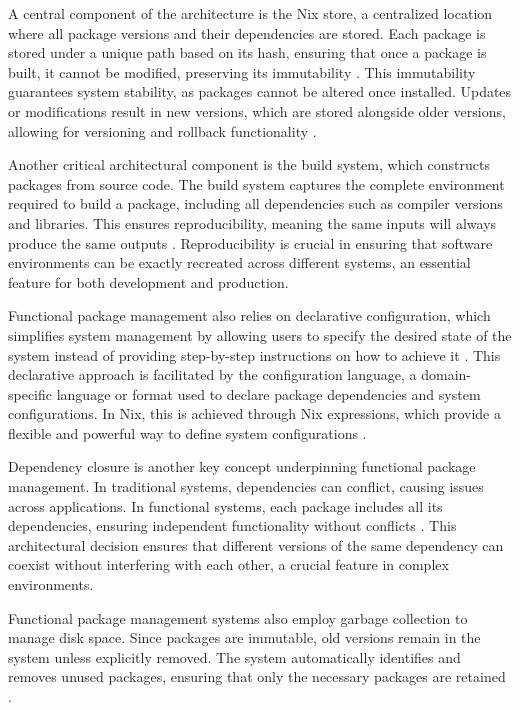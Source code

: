 A central component of the architecture is the Nix store, a centralized location where all
package versions and their dependencies are stored. Each package is stored under a unique
path based on its hash, ensuring that once a package is built, it cannot be modified, preserving
its immutability \cite[Chapter 5.2]{dolstraPurelyFunctionalSoftware2006}. This immutability
guarantees system stability, as packages cannot be altered once installed. Updates or
modifications result in new versions, which are stored alongside older versions, allowing
for versioning and rollback functionality \cite[Chapter 1.5]{dolstraPurelyFunctionalSoftware2006}.

Another critical architectural component is the build system, which constructs packages from
source code. The build system captures the complete environment required to build a package,
including all dependencies such as compiler versions and libraries. This ensures reproducibility,
meaning the same inputs will always produce the same outputs
\cite[Section 2.6]{dolstraPurelyFunctionalSoftware2006}. Reproducibility is crucial in ensuring
that software environments can be exactly recreated across different systems, an essential
feature for both development and production.

Functional package management also relies on declarative configuration, which simplifies system
management by allowing users to specify the desired state of the system instead of providing
step-by-step instructions on how to achieve it \cite[Section 2.2]{courtesFunctionalPackageManagement2013}.
This declarative approach is facilitated by the configuration language, a domain-specific language
or format used to declare package dependencies and system configurations. In Nix, this is
achieved through Nix expressions, which provide a flexible and powerful way to define system
configurations \cite[Chapter 2.2]{dolstraPurelyFunctionalSoftware2006}.

Dependency closure is another key concept underpinning functional package management. In traditional
systems, dependencies can conflict, causing issues across applications. In functional systems, each
package includes all its dependencies, ensuring independent functionality without conflicts
\cite[Chapter 3.3]{dolstraPurelyFunctionalSoftware2006}. This architectural decision ensures that
different versions of the same dependency can coexist without interfering with each other, a crucial
feature in complex environments.

Functional package management systems also employ garbage collection to manage disk space. Since
packages are immutable, old versions remain in the system unless explicitly removed. The system
automatically identifies and removes unused packages, ensuring that only the necessary packages
are retained \cite[Section 2.2]{courtesFunctionalPackageManagement2013}.

